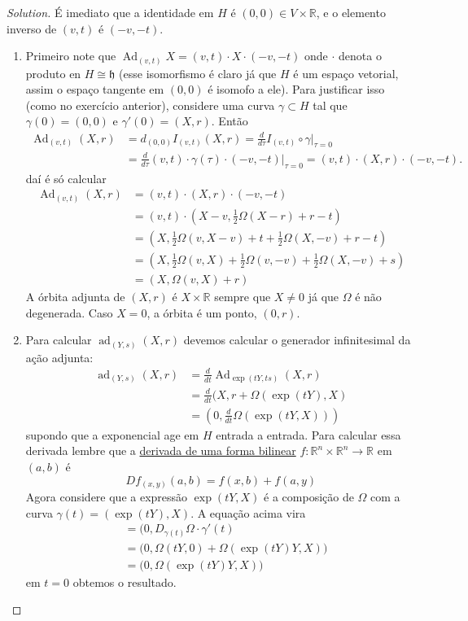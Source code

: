 \begin{proof}[Solution]\leavevmode
É imediato que a identidade em $H$ é $(0,0)\in V\times \mathbb{R}$, e o elemento inverso de $(v,t)$  é $(-v,-t)$.
 \begin{enumerate}[label=\alph*.]
	\item Primeiro note que $\operatorname{Ad}_{(v,t)}X=(v,t)\cdot X\cdot(-v,-t)$ onde $\cdot$ denota o produto en $H\cong \mathfrak{h}$ (esse isomorfismo é claro já que $H$ é um espaço vetorial, assim o espaço tangente em $(0,0)$  é isomofo a ele). Para justificar isso (como no exercício anterior), considere uma curva $\gamma\subset H$ tal que $\gamma(0)=(0,0)$ e $\gamma'(0)=(X,r)$. Então 
		\begin{align*}
			\operatorname{Ad}_{(v,t)}(X,r)&=d_{(0,0)}I_{(v,t)}(X,r)=\frac{d}{d\tau}I_{(v,t)}\circ \gamma\Big|_{\tau=0}\\&=\frac{d}{d\tau}(v,t)\cdot \gamma(\tau)\cdot(-v,-t)\Big|_{\tau=0}=(v,t)\cdot (X,r)\cdot(-v,-t).
		\end{align*}
daí é só calcular
		\begin{align*}
			\operatorname{Ad}_{(v,t)}(X,r)&=(v,t)\cdot(X,r)\cdot(-v,-t)\\
			&=(v,t)\cdot\left(X-v, \frac{1}{2}\Omega(X-r)+r-t \right) \\
			&=\left( X,\frac{1}{2}\Omega(v,X-v)+t+\frac{1}{2}\Omega(X,-v)+r-t \right) \\
			&=\left( X,\frac{1}{2}\Omega(v,X)+\frac{1}{2}\Omega(v,-v)+\frac{1}{2}\Omega(X,-v)+s \right) \\
			&=(X,\Omega(v,X)+r)
		\end{align*}
A órbita adjunta de $(X,r)$  é $X\times \mathbb{R}$ sempre que $X\neq 0$ já que $\Omega$ é não degenerada. Caso $X=0$, a  órbita é um ponto, $(0,r)$.

\item Para calcular $\operatorname{ad}_{(Y,s)}(X,r)$ devemos calcular o generador infinitesimal da ação adjunta:\begin{align*}
			\operatorname{ad}_{(Y,s)}(X,r)&=\frac{d}{dt}\operatorname{Ad}_{\operatorname{exp}(tY, ts)}(X,r)\\
			&=\frac{d}{dt}(X,r+\Omega(\operatorname{exp}(tY),X)\\
			&=\left( 0,\frac{d}{dt}\Omega(\operatorname{exp}(tY,X))\right)
		\end{align*}
		supondo que a exponencial age em $H$ entrada a entrada. Para calcular essa derivada lembre que a \href{https://math.stackexchange.com/questions/1120430/derivative-of-bilinear-forms}{derivada de uma forma bilinear}  $f:\mathbb{R}^{n}\times \mathbb{R}^{n}\to \mathbb{R}$ em $(a,b)$ é
		\[Df_{(x,y)}(a,b)=f(x,b)+f(a,y)\]
		Agora considere que a expressão $\operatorname{exp}(tY,X)$ é a composição de $\Omega$ com a curva $\gamma(t)=(\operatorname{exp}(tY),X)$. A equação acima vira
		\begin{align*}
			&=(0,D_{\gamma(t)}\Omega\cdot \gamma'(t)\\
			&=\Big(0,\Omega(tY,0)+\Omega( \operatorname{exp}(tY)Y,X) \Big)\\
			&=\Big(0,\Omega(\operatorname{exp}(tY)Y,X)\Big)
		\end{align*}
		em $t=0$ obtemos o resultado.


\end{enumerate}
\end{proof}
